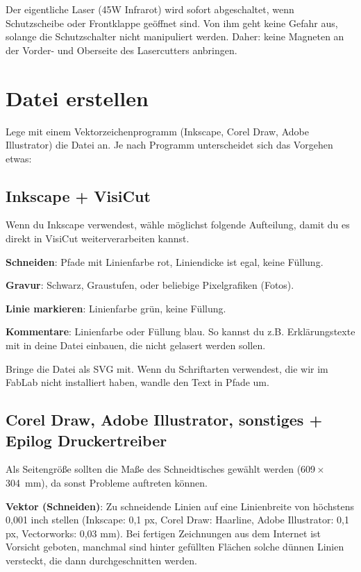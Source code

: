 \documentclass{\basedir/fablab-document}
\begin{document}
Der eigentliche Laser (45W Infrarot) wird sofort abgeschaltet, wenn Schutzscheibe oder Frontklappe geöffnet sind. Von ihm geht keine Gefahr aus, solange die Schutzschalter nicht manipuliert werden. Daher: keine Magneten an der Vorder- und Oberseite des Lasercutters anbringen.

\section{Datei erstellen}
Lege mit einem Vektorzeichenprogramm (Inkscape, Corel Draw, Adobe Illustrator) die Datei an. Je nach Programm unterscheidet sich das Vorgehen etwas:


\subsection{Inkscape + VisiCut}
Wenn du Inkscape verwendest, wähle möglichst folgende Aufteilung, damit du es direkt in VisiCut weiterverarbeiten kannst.

\textbf{Schneiden}: Pfade mit Linienfarbe rot, Liniendicke ist egal, keine Füllung.

\textbf{Gravur}: Schwarz, Graustufen, oder beliebige Pixelgrafiken (Fotos).

\textbf{Linie markieren}: Linienfarbe grün, keine Füllung.

\textbf{Kommentare}: Linienfarbe oder Füllung blau. So kannst du z.B. Erklärungstexte mit in deine Datei einbauen, die nicht gelasert werden sollen.

Bringe die Datei als SVG mit. Wenn du Schriftarten verwendest, die wir im FabLab nicht installiert haben, wandle den Text in Pfade um.



\subsection{Corel Draw, Adobe Illustrator, sonstiges + Epilog Druckertreiber}
Als Seitengröße sollten die Maße des Schneidtisches gewählt werden (609\,$\times$\,304~mm), da sonst Probleme auftreten können.

\textbf{Vektor (Schneiden)}: Zu schneidende Linien auf eine Linienbreite von höchstens 0,001 inch stellen (Inkscape: 0,1 px, Corel Draw: Haarline, Adobe Illustrator: 0,1 px, Vectorworks: 0,03 mm). Bei fertigen Zeichnungen aus dem Internet ist Vorsicht geboten, manchmal sind hinter gefüllten Flächen solche dünnen Linien versteckt, die dann durchgeschnitten werden.
\end{document}

